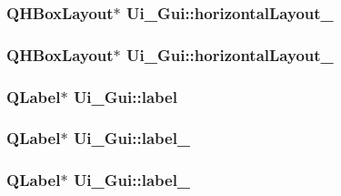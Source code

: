\label{classUi__Gui_a1ed613358f44f0e6e7e9f7a982a2d539}
\hypertarget{classUi__Gui_aa9a593b9160a357d99e7b667daded3f3}{
\subsubsection[{horizontalLayout\_\-7}]{\setlength{\rightskip}{0pt plus 5cm}QHBoxLayout$\ast$ {\bf Ui\_\-Gui::horizontalLayout\_}}}
\label{classUi__Gui_aa9a593b9160a357d99e7b667daded3f3}
\hypertarget{classUi__Gui_a04f0f0ebebff6b0c57118002d4206521}{
\subsubsection[{horizontalLayout\_\-8}]{\setlength{\rightskip}{0pt plus 5cm}QHBoxLayout$\ast$ {\bf Ui\_\-Gui::horizontalLayout\_}}}
\label{classUi__Gui_a04f0f0ebebff6b0c57118002d4206521}
\hypertarget{classUi__Gui_a4c5f4c354553588e40853bfc414ce89d}{
\subsubsection[{label}]{\setlength{\rightskip}{0pt plus 5cm}QLabel$\ast$ {\bf Ui\_\-Gui::label}}}
\label{classUi__Gui_a4c5f4c354553588e40853bfc414ce89d}
\hypertarget{classUi__Gui_a3a371e9c7fc230f4ddcf3d2474f2c557}{
\subsubsection[{label\_\-2}]{\setlength{\rightskip}{0pt plus 5cm}QLabel$\ast$ {\bf Ui\_\-Gui::label\_}}}
\label{classUi__Gui_a3a371e9c7fc230f4ddcf3d2474f2c557}
\hypertarget{classUi__Gui_ab80a95742f83006b4f5e02698e5c79fc}{
\subsubsection[{label\_\-3}]{\setlength{\rightskip}{0pt plus 5cm}QLabel$\ast$ {\bf Ui\_\-Gui::label\_}}}
\label{classUi__Gui_ab80a95742f83006b4f5e02698e5c79fc}
